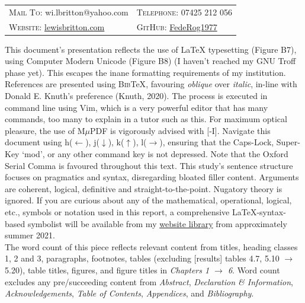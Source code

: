\documentclass[11pt, english]{article}
\begin{document}
	\begin{center}
		\small
	\begin{tabular}{p{5.45cm}|p{5.45cm}}
		\textsc{Mail To:} wi.lbritton@yahoo.com & \textsc{Telephone:} 07425 212 056\\
		\textsc{Website:} \href{http://lewisbritton.com}{lewisbritton.com} & \textsc{GitHub:} \href{https://github.com/FedeRog1977}{FedeRog1977}\\
	\end{tabular}
	\end{center}

	This document’s presentation reflects the use of {\LaTeX} typesetting (Figure B7), using Computer Modern Unicode (Figure B8) (I haven't reached my GNU Troff phase yet). This escapes the inane formatting requirements of my institution. References are presented using \textsc{Bib}{\TeX}, favouring \textsl{oblique} over \textit{italic}, in-line with Donald E. Knuth’s preference (Knuth, 2020). The process is executed in command line using Vim, which is a very powerful editor that has many commands, too many to explain in a tutor such as this. For maximum optical pleasure, the use of M$\mu$PDF is vigorously advised with [-I]. Navigate this document using h($\leftarrow$), j($\downarrow$), k($\uparrow$), l($\rightarrow$), ensuring that the Caps-Lock, Super-Key `mod', or any other command key is not depressed. Note that the Oxford Serial Comma is favoured throughout this text. This study's sentence structure focuses on pragmatics and syntax, disregarding bloated filler content. Arguments are coherent, logical, definitive and straight-to-the-point. Nugatory theory is ignored. If you are curious about any of the mathematical, operational, logical, etc., symbols or notation used in this report, a comprehensive {\LaTeX}-syntax-based symbolist will be available from my \href{http://lewisbritton.com/library.html}{website library} from approximately summer 2021.\\
 
	The word count of this piece reflects relevant content from titles, heading classes 1, 2 and 3, paragraphs, footnotes, tables (excluding [results] tables 4.7, 5.10 $\rightarrow$ 5.20), table titles, figures, and figure titles in \textit{Chapters 1 $\rightarrow$ 6}. Word count excludes any pre/succeeding content from \textit{Abstract}, \textit{Declaration \& Information}, \textit{Acknowledgements}, \textit{Table of Contents}, \textit{Appendices}, and \textit{Bibliography}.\\
\end{document}
